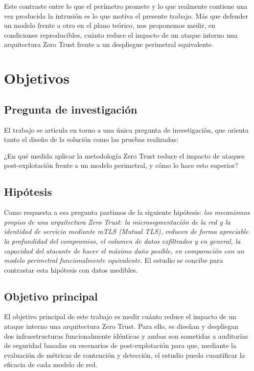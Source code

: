 \documentclass[11pt,spanish,listoffigures,listoftables]{tfgetsinf}
\begin{document}
    Este contraste entre lo que el perímetro promete y lo que realmente contiene una vez producida la intrusión es lo que motiva el presente trabajo. Más que defender un modelo frente a otro en el plano teórico, nos proponemos medir, en condiciones reproducibles, cuánto reduce el impacto de un ataque interno una arquitectura Zero Trust frente a un despliegue perimetral equivalente.
    
    \section{Objetivos}
    \label{sec:1.2}
        \subsection{Pregunta de investigación}
        El trabajo se articula en torno a una única pregunta de investigación, que orienta tanto el diseño de la solución como las pruebas realizadas:

        \begin{tcolorbox}[
            enhanced,
            frame hidden,
            borderline west={3pt}{0pt}{gray!70!black},
            sharp corners
        ]
            ¿En qué medida aplicar la metodología Zero Trust reduce el impacto de ataques post-explotación frente a un modelo perimetral, y cómo lo hace esto superior?
        \end{tcolorbox}


        \subsection{Hipótesis}
        Como respuesta a esa pregunta partimos de la siguiente hipótesis: \emph{los mecanismos propios de una arquitectura Zero Trust: la microsegmentación de la red y la identidad de servicio mediante mTLS (Mutual TLS), reducen de forma apreciable la profundidad del compromiso, el volumen de datos exfiltrados y en general, la capacidad del atacante de hacer el máximo daño posible, en comparación con un modelo perimetral funcionalmente equivalente.} El estudio se concibe para contrastar esta hipótesis con datos medibles.

        \subsection{Objetivo principal}
        El objetivo principal de este trabajo es medir cuánto reduce el impacto de un ataque interno una arquitectura Zero Trust. Para ello, se diseñan y despliegan dos infraestructuras funcionalmente idénticas y ambas son sometidas a auditorías de seguridad basadas en escenarios de post-explotación para que, mediante la evaluación de métricas de contención y detección, el estudio pueda cuantificar la eficacia de cada modelo de red.
\end{document}
